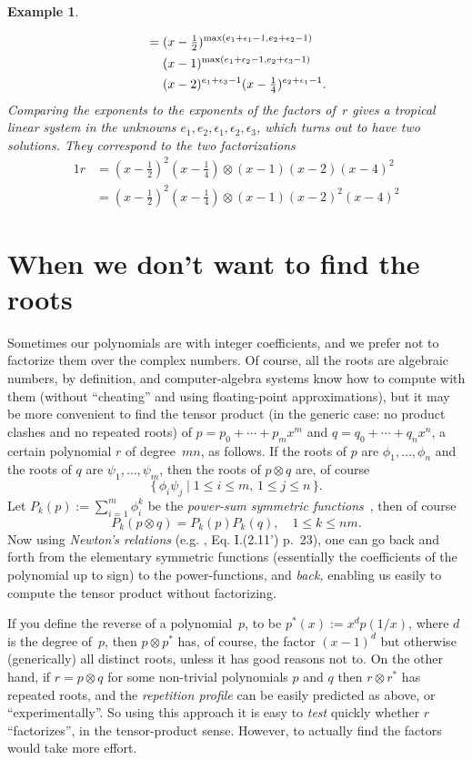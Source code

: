 \documentclass{sig-alternate}
\newtheorem{example}[theorem]{Example}
\begin{document}
\begin{example}
\begin{enumerate}
\begin{alignat*}
      &=(x-\tfrac12)^{\max(e_1+\epsilon_1-1,e_2+\epsilon_2-1)}\\
      &\hphantom{{}={}}(x-1)^{\max(e_1+\epsilon_2-1,e_2+\epsilon_3-1)}\\
      &\hphantom{{}={}}(x-2)^{e_1+\epsilon_3-1}(x-\tfrac14)^{e_2+\epsilon_1-1}.
    \end{alignat*}
    Comparing the exponents to the exponents of the factors of~$r$ gives a tropical linear system
    in the unknowns $e_1,e_2,\epsilon_1,\epsilon_2,\epsilon_3$, which turns out to have two solutions. They
    correspond to the two factorizations
    \begin{alignat*}1
      r&=(x-\tfrac12)^2(x-\tfrac14)\otimes(x-1)(x-2)(x-4)^2\\
       &=(x-\tfrac12)^2(x-\tfrac14)\otimes(x-1)(x-2)^2(x-4)^2
    \end{alignat*}    
  \end{enumerate}  
\end{example}


\section{When we don't want to find the roots}

Sometimes our polynomials are with integer coefficients, and we prefer not to factorize them over the complex numbers. Of course, all
the roots are algebraic numbers, by definition, and computer-algebra systems know how to compute with them (without ``cheating'' and using
floating-point approximations), but it may be more convenient to find the tensor product (in the generic case: no product
clashes and no repeated roots) of $p=p_0+\cdots+p_mx^m$ and $q=q_0+\cdots+q_nx^n$,
a certain polynomial $r$ of degree~$mn$, as follows.
If the roots of $p$ are $\phi_1,\dots,\phi_n$ and  the roots of $q$ are $\psi_1,\dots,\psi_m$, then
the roots of $p\otimes q$ are, of course
$$
\{ \, \phi_i \psi_j \mid 1 \leq i \leq m, \, 1 \leq j \leq n \, \}.
$$
Let $P_k(p):=\sum_{i=1}^m \phi_i^k$ be the {\it power-sum symmetric functions}~\cite{macdonald95}, then of course
$$
 P_k(p\otimes q)= P_k(p) P_k(q), \quad 1 \leq k \leq nm.
$$
Now using {\it Newton's relations} (e.g. \cite{macdonald95}, Eq. I.(2.11') p.~23), one can go back and forth from
the elementary symmetric functions (essentially the coefficients of the polynomial up to sign) to the power-functions,
and {\it back,} enabling us easily to compute the tensor product without factorizing.

If you define the reverse of a polynomial~$p$, to be $p^{*}(x):=x^d p(1/x)$, where $d$ is the degree of~$p$,
then $p\otimes p^{*}$ has, of course, the factor $(x-1)^d$ but otherwise (generically) all distinct roots,
unless it has good reasons not to.
On the other hand, if $r=p \otimes q$ for some non-trivial polynomials $p$ and $q$ then  $r \otimes r^{*}$ has repeated roots,
and the {\it repetition profile} can be easily predicted as above, or ``experimentally''. So using
this approach it is easy to {\it test} quickly whether $r$ ``factorizes'', in the tensor-product sense.
However, to actually find the factors would take more effort.
\end{document}
